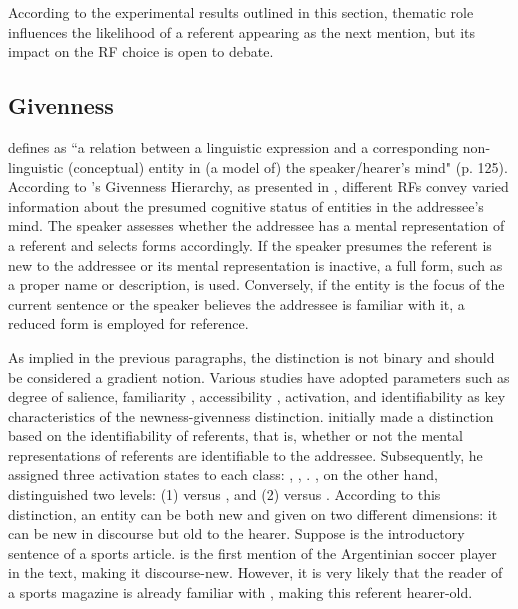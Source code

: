 According to the experimental results outlined in this section, thematic role influences the likelihood of a referent appearing as the next mention, but its impact on the RF choice is open to debate.

\subsection{Givenness}\label{subsec:givennness}

\citet{gundel2003} defines  as ``a relation between a linguistic expression and a corresponding non-linguistic (conceptual) entity in (a model of) the speaker/hearer's mind" (p. 125). According to \citeauthor{gundel1993cognitive}'s Givenness Hierarchy, as presented in , different RFs convey varied information about the presumed cognitive status of entities in the addressee's mind.
The speaker assesses whether the addressee has a mental representation of a referent and selects forms accordingly. If the speaker presumes the referent is new to the addressee or its mental representation is inactive, a full form, such as a proper name or description, is used. Conversely, if the entity is the focus of the current sentence or the speaker believes the addressee is familiar with it, a reduced form is employed for reference.

As implied in the previous paragraphs, the  distinction is not binary and should be considered a gradient notion. Various studies have adopted parameters such as degree of salience, familiarity \citep{prince1992zpg}, accessibility \citep{ariel2001accessibility}, activation, and identifiability \citep{chafe1976givenness} as key characteristics of the newness-givenness distinction. \citet{chafe1976givenness} initially made a distinction based on the identifiability of referents, that is, whether or not the mental representations of referents are identifiable to the addressee. Subsequently, he assigned three activation states to each class: , , . \citet{prince1992zpg}, on the other hand, distinguished two levels: (1)  versus , and (2)  versus . According to this distinction, an entity can be both new and given on two different dimensions: it can be new in discourse but old to the hearer. Suppose  is the introductory sentence of a sports article.  is the first mention of the Argentinian soccer player in the text, making it discourse-new. However, it is very likely that the reader of a sports magazine is already familiar with , making this referent hearer-old.


